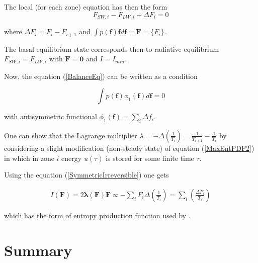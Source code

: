 \documentclass[a4paper,12pt]{article}
\begin{document}
The local (for each zone) equation has then the form
\begin{equation}
  F_{SW,i}- F_{LW,i} + \Delta F_i = 0
\end{equation}

where $\Delta F_i = F_i - F_{i+1}$ and $\int p(\bm{f})\bm{f} d\bm{f}=\bm{F}=\{F_i\}$. 

The basal equilibrium state corresponds then to radiative equilibrium $F_{SW,i}= F_{LW,i}$ with $\bm{F}=\bm{0}$ and $I=I_{min}$.

Now, the equation (\ref{BalanceEq}) can be written as a condition

\begin{equation}
  \int p(\bm{f})\phi_1(\bm{f})d\bm{f} =0
\end{equation}

with antisymmetric functional $\phi_1(\bm{f})=\sum_i \Delta f_i$. 

One can show that the Lagrange multiplier $\lambda = - \Delta (\frac{1}{T_i}) = \frac{1}{T_{i+1}}-\frac{1}{T_i}$ by considering a slight modification (non-steady state) of equation (\ref{MaxEntPDF2}) in which in zone $i$ energy $u(\tau)$ is stored for some finite time $\tau$\cite{Dewar:2014ek}. 

Using the equation (\ref{SymmetricIrreversible}) one gets

\begin{equation}
\begin{aligned}
  I(\bm{F})=2 \bm{\lambda}(\bm{F})\bm{F} \propto - \sum_i F_i \Delta(\frac{1}{T_i})= \sum_i (\frac{\Delta F_i}{T_i})
\end{aligned}
\end{equation}

which has the form of entropy production function used by \cite{Paltridge:2007jf}\cite{Lorenz:J80tzZkl}.
  
\newpage
\section{Summary}



\newpage



\end{document}
